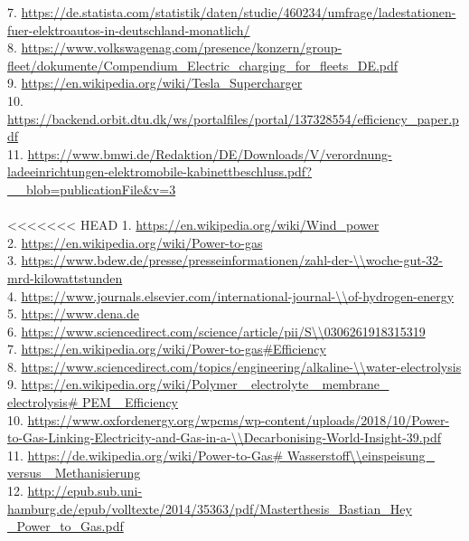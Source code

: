 \begin{parcolumns}[colwidths={1=2.5 cm, 2=12 cm}]{2}
{7. \url{https://de.statista.com/statistik/daten/studie/460234/umfrage/ladestationen-fuer-elektroautos-in-deutschland-monatlich/} \\
8. \url{https://www.volkswagenag.com/presence/konzern/group-fleet/dokumente/Compendium_Electric_charging_for_fleets_DE.pdf} \\
9. \url{https://en.wikipedia.org/wiki/Tesla_Supercharger} \\
10. \url{https://backend.orbit.dtu.dk/ws/portalfiles/portal/137328554/efficiency_paper.pdf} \\
11. \url{https://www.bmwi.de/Redaktion/DE/Downloads/V/verordnung-ladeeinrichtungen-elektromobile-kabinettbeschluss.pdf?__blob=publicationFile&v=3} \\
\\
<<<<<<< HEAD
1. \url{https://en.wikipedia.org/wiki/Wind_power}\\
2. \url{https://en.wikipedia.org/wiki/Power-to-gas}\\
3. \url{https://www.bdew.de/presse/presseinformationen/zahl-der-\\woche-gut-32-mrd-kilowattstunden} \\
4. \url{https://www.journals.elsevier.com/international-journal-\\of-hydrogen-energy}\\
5. \url{https://www.dena.de}\\
6. \url{https://www.sciencedirect.com/science/article/pii/S\\0306261918315319}\\
7. \url{https://en.wikipedia.org/wiki/Power-to-gas\#Efficiency}\\ 
8. \url{https://www.sciencedirect.com/topics/engineering/alkaline-\\water-electrolysis}\\
9. \url{https://en.wikipedia.org/wiki/Polymer\_ electrolyte\_ membrane\_ electrolysis\# PEM\_ Efficiency}\\
10. \url{https://www.oxfordenergy.org/wpcms/wp-content/uploads/2018/10/Power-to-Gas-Linking-Electricity-and-Gas-in-a-\\Decarbonising-World-Insight-39.pdf}\\
11. \url{https://de.wikipedia.org/wiki/Power-to-Gas\# Wasserstoff\\einspeisung\_ versus\_ Methanisierung}\\
12. \url{http://epub.sub.uni-hamburg.de/epub/volltexte/2014/35363/pdf/Masterthesis\_Bastian\_Hey
\_Power\_to\_Gas.pdf}\\
}
\end{parcolumns}

